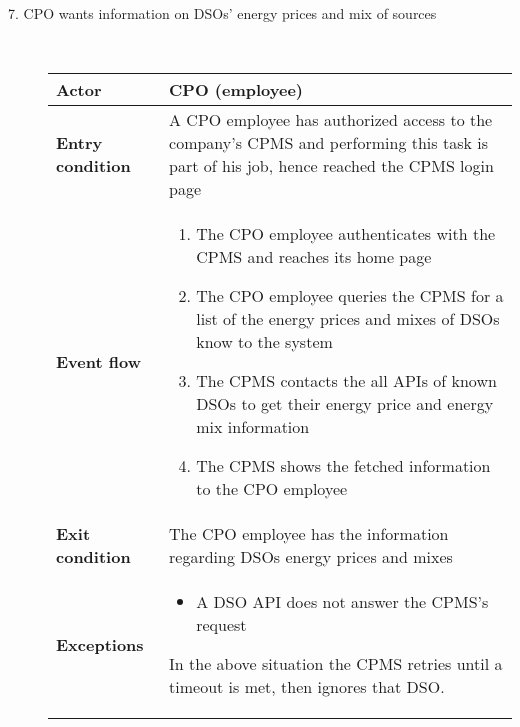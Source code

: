 \documentclass[11pt]{article}
\begin{document}
\begin{description}
    \item [7. CPO wants information on DSOs’ energy prices and mix of sources] \hfill \\
    \begin{table}[H]
        \centering
        \setlength{\tabcolsep}{18pt}
        \renewcommand{\arraystretch}{1.4}
        \begin{tabularx}{\textwidth}{|>{\hsize=0.5\hsize}X|>{\hsize=1.5\hsize}X|}
            \hline
            \textbf{Actor} & CPO (employee) \\
            \hline
            \textbf{Entry condition} & A CPO employee has authorized access to the company's CPMS and performing this task is part of his job, hence reached the CPMS login page \\
            \hline
            \textbf{Event flow} & 
                \begin{minipage}[t]{\hsize}
                \begin{enumerate}[topsep=0pt, leftmargin=*]
                    \item The CPO employee authenticates with the CPMS and reaches its home page
                    \item The CPO employee queries the CPMS for a list of the energy prices and mixes of DSOs know to the system
                    \item The CPMS contacts the all APIs of known DSOs to get their energy price and energy mix information
                    \item The CPMS shows the fetched information to the CPO employee
                \end{enumerate}
                \end{minipage}
                \vspace{6pt}
            \\
            \hline
            \textbf{Exit condition} & The CPO employee has the information regarding DSOs energy prices and mixes \\
            \hline
            \textbf{Exceptions} & 
                \begin{minipage}[t]{\hsize}
                \vspace{0pt}
                \begin{itemize}[topsep=0pt, leftmargin=*]
                    \item A DSO API does not answer the CPMS's request
                \end{itemize}
                \vspace{8pt}
                \end{minipage}
                In the above situation the CPMS retries until a timeout is met, then ignores that DSO.
                \vspace{6pt}
            \\
            \hline
        \end{tabularx}
    \end{table}
    

\end{description}
\end{document}
